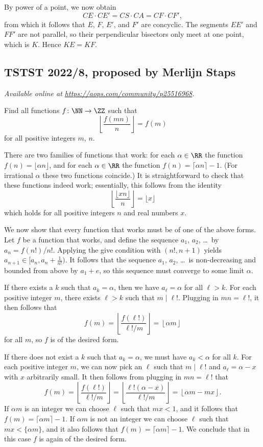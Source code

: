 \documentclass[11pt]{scrartcl}
\begin{document}
By power of a point, we now obtain
\[ CE \cdot CE' = CS \cdot CA = CF \cdot CF', \]
from which it follows that $E$, $F$, $E'$, and $F'$ are concyclic.
The segments $EE'$ and $FF'$ are not parallel, so their
perpendicular bisectors only meet at one point, which is $K$.
Hence $KE=KF$.
\pagebreak

\subsection{TSTST 2022/8, proposed by Merlijn Staps}
\textsl{Available online at \url{https://aops.com/community/p25516968}.}
\begin{mdframed}[style=mdpurplebox,frametitle={Problem statement}]
Find all functions $f \colon \NN \to \ZZ$ such that
\[ \left\lfloor \frac{f(mn)}{n} \right\rfloor = f(m) \]
for all positive integers $m$, $n$.
\end{mdframed}
There are two families of functions that work:
for each $\alpha \in \RR$ the function $f(n) = \lfloor \alpha n \rfloor$,
and for each $\alpha \in \RR$ the function
$f(n) = \lceil \alpha n \rceil - 1$.
(For irrational $\alpha$ these two functions coincide.)
It is straightforward to check that these functions indeed work;
essentially, this follows from the identity
\[ \left\lfloor \frac{\lfloor xn \rfloor}{n} \right\rfloor
  = \lfloor x \rfloor \]
which holds for all positive integers $n$ and real numbers $x$.

We now show that every function that works must be of one of the above forms.
Let $f$ be a function that works,
and define the sequence $a_1$, $a_2$, \dots\ by $a_n = f(n!)/n!$.
Applying the give condition with $(n!, n+1)$ yields
$a_{n+1} \in [a_n, a_n + \frac{1}{n!})$. %
It follows that the sequence $a_1$, $a_2$, \dots\ is
non-decreasing and bounded from above by $a_1 + e$,
so this sequence must converge to some limit $\alpha$.

If there exists a $k$ such that $a_k = \alpha$,
then we have $a_\ell = \alpha$ for all $\ell > k$.
For each positive integer $m$,
there exists $\ell > k$ such that $m \mid \ell!$.
Plugging in $mn=\ell!$, it then follows that
\[ f(m) = \left\lfloor \frac{f(\ell!)}{\ell! / m} \right \rfloor
  = \left \lfloor \alpha m \right \rfloor \]
for all $m$, so $f$ is of the desired form.

If there does not exist a $k$ such that $a_k = \alpha$,
we must have $a_k < \alpha$ for all $k$.
For each positive integer $m$, we can now pick an $\ell$
such that $m \mid \ell!$ and $a_{\ell} = \alpha - x$
with $x$ arbitrarily small.
It then follows from plugging in $mn=\ell!$ that
\[ f(m) = \left\lfloor \frac{f(\ell!)}{\ell! / m} \right \rfloor
  = \left\lfloor \frac{\ell!(\alpha - x)}{\ell!/m} \right\rfloor
  = \left\lfloor \alpha m - mx \right \rfloor. \]
If $\alpha m$ is an integer we can choose $\ell$ such that $mx < 1$,
and it follows that $f(m) = \lceil \alpha m \rceil - 1$.
If $\alpha m$ is not an integer we can choose $\ell$
such that $mx < \{\alpha m \}$,
and it also follows that $f(m) = \lceil \alpha m \rceil - 1$.
We conclude that in this case $f$ is again of the desired form.
\pagebreak
\end{document}
